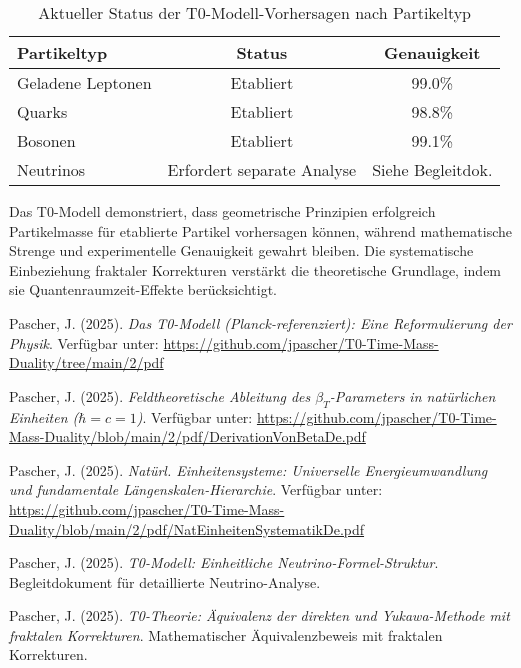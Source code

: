 \documentclass[12pt,a4paper]{article}
\begin{document}
\begin{table}[H]
	\centering
	\begin{tabular}{lcc}
		\toprule
		\textbf{Partikeltyp} & \textbf{Status} & \textbf{Genauigkeit} \\
		\midrule
		Geladene Leptonen & Etabliert & 99.0\% \\
		Quarks & Etabliert & 98.8\% \\
		Bosonen & Etabliert & 99.1\% \\
		Neutrinos & Erfordert separate Analyse & Siehe Begleitdok. \\
		\bottomrule
	\end{tabular}
	\caption{Aktueller Status der T0-Modell-Vorhersagen nach Partikeltyp}
	\label{tab:status_summary}
\end{table}

Das T0-Modell demonstriert, dass geometrische Prinzipien erfolgreich Partikelmasse f\"ur etablierte Partikel vorhersagen k\"o{}nnen, w\"a{}hrend mathematische Strenge und experimentelle Genauigkeit gewahrt bleiben. Die systematische Einbeziehung fraktaler Korrekturen verst\"a{}rkt die theoretische Grundlage, indem sie Quantenraumzeit-Effekte ber\"u{}cksichtigt.

\newpage
\begin{thebibliography}{99}
	Pascher, J. (2025). \textit{Das T0-Modell (Planck-referenziert): Eine Reformulierung der Physik}. Verf\"u{}gbar unter: \url{https://github.com/jpascher/T0-Time-Mass-Duality/tree/main/2/pdf}
	
	Pascher, J. (2025). \textit{Feldtheoretische Ableitung des $\beta_T$-Parameters in nat\"u{}rlichen Einheiten ($\hbar = c = 1$)}. Verf\"u{}gbar unter: \url{https://github.com/jpascher/T0-Time-Mass-Duality/blob/main/2/pdf/DerivationVonBetaDe.pdf}
	
	Pascher, J. (2025). \textit{Nat\"u{}rl. Einheitensysteme: Universelle Energieumwandlung und fundamentale L\"a{}ngenskalen-Hierarchie}. Verf\"u{}gbar unter: \url{https://github.com/jpascher/T0-Time-Mass-Duality/blob/main/2/pdf/NatEinheitenSystematikDe.pdf}
	
	Pascher, J. (2025). \textit{T0-Modell: Einheitliche Neutrino-Formel-Struktur}. Begleitdokument f\"ur detaillierte Neutrino-Analyse.
	
	Pascher, J. (2025). \textit{T0-Theorie: \"A{}quivalenz der direkten und Yukawa-Methode mit fraktalen Korrekturen}. Mathematischer \"A{}quivalenzbeweis mit fraktalen Korrekturen.
	
\end{thebibliography}
\end{document}
